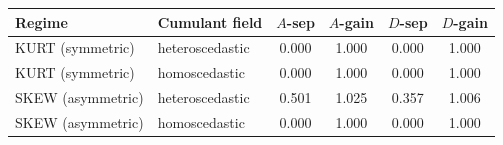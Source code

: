 \begin{tabular}{llcccc}
\toprule
Regime & Cumulant field & $A$-sep & $A$-gain & $D$-sep & $D$-gain \\
\midrule
KURT (symmetric) & heteroscedastic & 0.000 & 1.000 & 0.000 & 1.000 \\
KURT (symmetric) & homoscedastic & 0.000 & 1.000 & 0.000 & 1.000 \\
SKEW (asymmetric) & heteroscedastic & 0.501 & 1.025 & 0.357 & 1.006 \\
SKEW (asymmetric) & homoscedastic & 0.000 & 1.000 & 0.000 & 1.000 \\
\bottomrule
\end{tabular}
